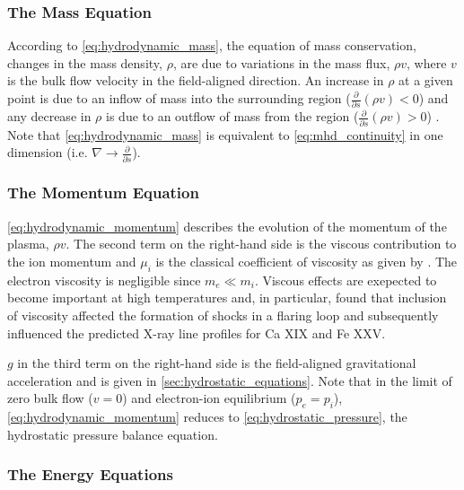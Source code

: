 \subsubsection{The Mass Equation}\label{sec:hydrodynamic-mass}

According to \autoref{eq:hydrodynamic_mass}, the equation of mass conservation, changes in the mass density, $\rho$, are due to variations in the mass flux, $\rho v$, where $v$ is the bulk flow velocity in the field-aligned direction. An increase in $\rho$ at a given point is due to an inflow of mass into the surrounding region ($\frac{\partial}{\partial s}(\rho v) < 0$) and any decrease in $\rho$ is due to an outflow of mass from the region ($\frac{\partial}{\partial s}(\rho v) > 0$) \citep{priest_magnetohydrodynamics_2014}. Note that \autoref{eq:hydrodynamic_mass} is equivalent to \autoref{eq:mhd_continuity} in one dimension (i.e. $\nabla\to\frac{\partial}{\partial s}$).

\subsubsection{The Momentum Equation}\label{sec:hydrodynamic-momentum}

\autoref{eq:hydrodynamic_momentum} describes the evolution of the momentum of the plasma, $\rho v$. The second term on the right-hand side is the viscous contribution to the ion momentum and $\mu_i$ is the classical coefficient of viscosity as given by \citet{spitzer_physics_1962}. The electron viscosity is negligible since $m_e\ll m_i$. Viscous effects are exepected to become important at high temperatures \citep{bradshaw_what_2011} and, in particular, \citet{peres_importance_1993} found that inclusion of viscosity affected the formation of shocks in a flaring loop and subsequently influenced the predicted X-ray line profiles for Ca XIX and Fe XXV. 

$g$ in the third term on the right-hand side is the field-aligned gravitational acceleration and is given in \autoref{sec:hydrostatic_equations}. Note that in the limit of zero bulk flow ($v=0$) and electron-ion equilibrium ($p_e=p_i$), \autoref{eq:hydrodynamic_momentum} reduces to \autoref{eq:hydrostatic_pressure}, the hydrostatic pressure balance equation.

\subsubsection{The Energy Equations}\label{sec:hydrodynamic-energy}


